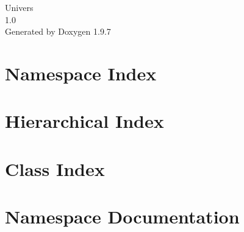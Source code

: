 \documentclass[twoside]{book}
\newcommand{\+}{\discretionary{\mbox{\scriptsize$\hookleftarrow$}}{}{}}
\newcommand{\clearemptydoublepage}{%
    \newpage{\pagestyle{empty}\cleardoublepage}%
  }
\begin{document}
  \raggedbottom
    \hypersetup{pageanchor=false,
                bookmarksnumbered=true,
                pdfencoding=unicode
               }
  \begin{titlepage}
  \vspace*{7cm}
  \begin{center}%
  {\Large Univers}\\
  [1ex]\large 1.\+0 \\
  \vspace*{1cm}
  {\large Generated by Doxygen 1.9.7}\\
  \end{center}
  \end{titlepage}
  \clearemptydoublepage
  \tableofcontents
  \clearemptydoublepage
  \hypersetup{pageanchor=true}
\chapter{Namespace Index}

\chapter{Hierarchical Index}

\chapter{Class Index}

\chapter{Namespace Documentation}















\end{document}
